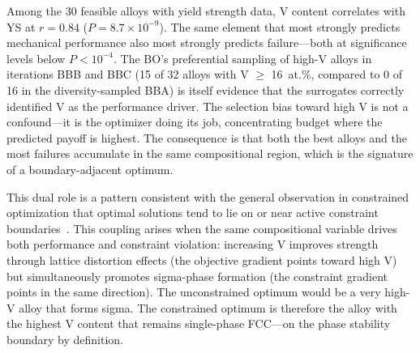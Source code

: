 \documentclass[preprint,12pt,times]{elsarticle}  %
\begin{document}
Among the 30 feasible alloys with yield strength data, V content correlates with YS at $r = 0.84$ ($P = 8.7 \times 10^{-9}$). The same element that most strongly predicts mechanical performance also most strongly predicts failure---both at significance levels below $P < 10^{-4}$. The BO's preferential sampling of high-V alloys in iterations BBB and BBC (15 of 32 alloys with V $\geq$ 16~at.\%, compared to 0 of 16 in the diversity-sampled BBA) is itself evidence that the surrogates correctly identified V as the performance driver. The selection bias toward high V is not a confound---it is the optimizer doing its job, concentrating budget where the predicted payoff is highest. The consequence is that both the best alloys and the most failures accumulate in the same compositional region, which is the signature of a boundary-adjacent optimum.

This dual role is a pattern consistent with the general observation in constrained optimization that optimal solutions tend to lie on or near active constraint boundaries~\cite{ray2009infeasibility}. This coupling arises when the same compositional variable drives both performance and constraint violation: increasing V improves strength through lattice distortion effects (the objective gradient points toward high V) but simultaneously promotes sigma-phase formation (the constraint gradient points in the same direction). The unconstrained optimum would be a very high-V alloy that forms sigma. The constrained optimum is therefore the alloy with the highest V content that remains single-phase FCC---on the phase stability boundary by definition.
\end{document}
